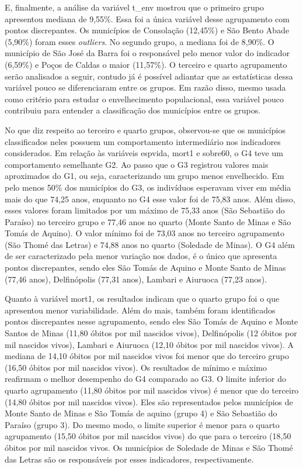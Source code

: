 \documentclass[10pt,twoside]{article}
\begin{document}
E, finalmente, a análise da variável t\_env mostrou que o primeiro grupo apresentou mediana de 9,55\%. Essa foi a única variável desse agrupamento com pontos discrepantes. Os municípios de Consolação (12,45\%) e São Bento Abade (5,90\%) foram esses \textit{outliers}. No segundo grupo, a mediana foi de 8,90\%. O município de São José da Barra foi o responsável pelo menor valor do indicador (6,59\%) e Poços de Caldas o maior (11,57\%). O terceiro e quarto agrupamento serão analisados a seguir, contudo já é possível adiantar que as estatísticas dessa variável pouco se diferenciaram entre os grupos. Em razão disso, mesmo usada como critério para estudar o envelhecimento populacional, essa variável pouco contribuiu para entender a classificação dos municípios entre os grupos. 

No que diz respeito ao terceiro e quarto grupos, observou-se que os municípios classificados neles possuem um comportamento intermediário nos indicadores considerados. Em relação às variáveis espvida, mort1 e sobre60, o G4 teve um comportamento semelhante G2. Ao passo que o G3 registrou valores mais aproximados do G1, ou seja, caracterizando um grupo menos envelhecido. Em pelo menos 50\% dos municípios do G3, os indivíduos esperavam viver em média mais do que 74,25 anos, enquanto no G4 esse valor foi de 75,83 anos. Além disso, esses valores foram limitados por um máximo de 75,33 anos (São Sebastião do Paraíso) no terceiro grupo e 77,46 anos no quarto (Monte Santo de Minas e São Tomás de Aquino). O valor mínimo foi de 73,03 anos no terceiro agrupamento (São Thomé das Letras) e 74,88 anos no quarto (Soledade de Minas). O G4 além de ser caracterizado pela menor variação nos dados, é o único que apresenta pontos discrepantes, sendo eles São Tomás de Aquino e Monte Santo de Minas (77,46 anos), Delfinópolis (77,31 anos), Lambari e Aiuruoca (77,23 anos).

Quanto à variável mort1, os resultados indicam que o quarto grupo foi o que apresentou menor variabilidade. Além do mais, também foram identificados pontos discrepantes nesse agrupamento, sendo eles São Tomás de Aquino e Monte Santos de Minas (11,80 óbitos por mil nascidos vivos), Delfinópolis (12 óbitos por mil nascidos vivos), Lambari e Aiuruoca (12,10 óbitos por mil nascidos vivos). A mediana de 14,10 óbitos por mil nascidos vivos foi menor que do terceiro grupo (16,50 óbitos por mil nascidos vivos). Os resultados de mínimo e máximo reafirmam o melhor desempenho do G4 comparado ao G3. O limite inferior do quarto agrupamento (11,80 óbitos por mil nascidos vivos) é menor que do terceiro (14,80 óbitos por mil nascidos vivos). Eles são representados pelos municípios de Monte Santo de Minas e São Tomás de aquino (grupo 4) e São Sebastião do Paraíso (grupo 3). Do mesmo modo, o limite superior é menor para o quarto agrupamento (15,50 óbitos por mil nascidos vivos) do que para o terceiro (18,50 óbitos por mil nascidos vivos. Os municípios de Soledade de Minas e São Thomé das Letras são os responsáveis por esses indicadores, respectivamente. 
\end{document}
